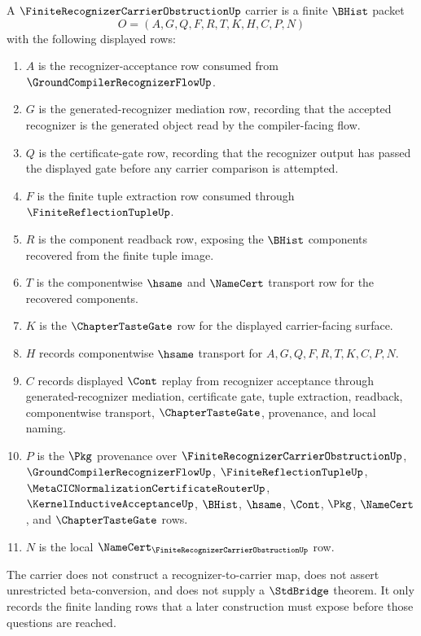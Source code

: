 \begin{definition}
\label{def:finite-recognizer-carrier-obstruction-carrier}
A $\FiniteRecognizerCarrierObstructionUp$ carrier is a finite $\BHist$ packet
$$
O=(A,G,Q,F,R,T,K,H,C,P,N)
$$
with the following displayed rows:
\begin{enumerate}
\item $A$ is the recognizer-acceptance row consumed from $\GroundCompilerRecognizerFlowUp$.
\item $G$ is the generated-recognizer mediation row, recording that the accepted recognizer is the generated object read by the compiler-facing flow.
\item $Q$ is the certificate-gate row, recording that the recognizer output has passed the displayed gate before any carrier comparison is attempted.
\item $F$ is the finite tuple extraction row consumed through $\FiniteReflectionTupleUp$.
\item $R$ is the component readback row, exposing the $\BHist$ components recovered from the finite tuple image.
\item $T$ is the componentwise $\hsame$ and $\NameCert$ transport row for the recovered components.
\item $K$ is the $\ChapterTasteGate$ row for the displayed carrier-facing surface.
\item $H$ records componentwise $\hsame$ transport for $A,G,Q,F,R,T,K,C,P,N$.
\item $C$ records displayed $\Cont$ replay from recognizer acceptance through generated-recognizer mediation, certificate gate, tuple extraction, readback, componentwise transport, $\ChapterTasteGate$, provenance, and local naming.
\item $P$ is the $\Pkg$ provenance over $\FiniteRecognizerCarrierObstructionUp$, $\GroundCompilerRecognizerFlowUp$, $\FiniteReflectionTupleUp$, $\MetaCICNormalizationCertificateRouterUp$, $\KernelInductiveAcceptanceUp$, $\BHist$, $\hsame$, $\Cont$, $\Pkg$, $\NameCert$, and $\ChapterTasteGate$ rows.
\item $N$ is the local $\NameCert_{\FiniteRecognizerCarrierObstructionUp}$ row.
\end{enumerate}
The carrier does not construct a recognizer-to-carrier map, does not assert unrestricted beta-conversion, and does not supply a $\StdBridge$ theorem. It only records the finite landing rows that a later construction must expose before those questions are reached.
\end{definition}

